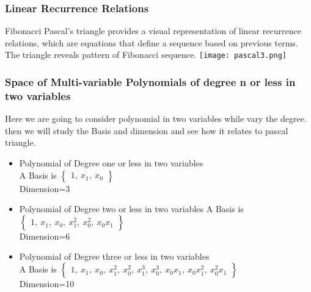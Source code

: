 \documentclass{beamer}
\begin{document}
\begin{frame}
\frametitle{Linear Recurrence Relations }
\begin{block}{Fibonacci}
 Pascal's triangle provides a visual representation of linear recurrence relations, which are equations that define a sequence based on previous terms. The triangle reveals pattern of Fibonacci sequence.
 \centering
\texttt{[image: pascal3.png]}
\end{block}
\end{frame}
\begin{frame}
\frametitle{Space of Multi-variable Polynomials of degree n or less in two variables}
\begin{block}{}
Here we are going to consider polynomial in two variables while vary the degree. then we will study the Basis and dimension and see how it relates to pascal triangle.
\begin{itemize}
\item Polynomial of Degree one or less in two variables\\
A Basis is $\begin{Bmatrix}1,~ x_1,~ x_0
\end{Bmatrix}$\\
Dimension=3\\
\item Polynomial of Degree two or less in two variables 
A Basis is $\begin{Bmatrix}1,~ x_1,~ x_0,~ x_1^2,~ x_0^2,~ x_0x_1
\end{Bmatrix}$\\
Dimension=6\\
\item Polynomial of Degree three or less in two variables \\
A Basis is $\begin{Bmatrix}1,~ x_1,~ x_0,~ x_1^2,~ x_0^2,~ x_1^3,~ x_0^3,~ x_0x_1,~ x_0x_1^2,~ x_0^2x_1
\end{Bmatrix}$\\
Dimension=10\\
\end{itemize}
\end{block}
\end{frame}
\end{document}
